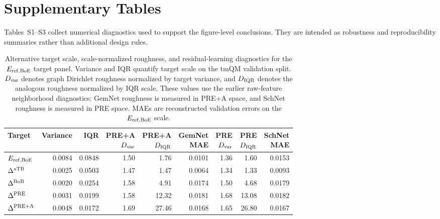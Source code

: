 \documentclass[11pt]{article}
\begin{document}
\clearpage

\section*{Supplementary Tables}

Tables~S1--S3 collect numerical diagnostics used to support the figure-level conclusions. They are intended as robustness and reproducibility summaries rather than additional design rules.

\begin{table}[H]
  \centering
  \scriptsize
  \setlength{\tabcolsep}{3pt}
  \caption{Alternative target scale, scale-normalized roughness, and residual-learning diagnostics for the \(E_{\rm ref,BoE}\) target panel. Variance and IQR quantify target scale on the tmQM validation split. \(D_{\rm var}\) denotes graph Dirichlet roughness normalized by target variance, and \(D_{\rm IQR}\) denotes the analogous roughness normalized by IQR scale. These values use the earlier raw-feature neighborhood diagnostics: GemNet roughness is measured in PRE+A space, and SchNet roughness is measured in PRE space. MAEs are reconstructed validation errors on the \(E_{\rm ref,BoE}\) scale.}
  \label{tab:target-scale-roughness-diagnostics}
  \begin{tabular}{lrrrrrrrr}
    \toprule
    Target &
    Variance &
    IQR &
    \shortstack{PRE+A\\\(D_{\rm var}\)} &
    \shortstack{PRE+A\\\(D_{\rm IQR}\)} &
    \shortstack{GemNet\\MAE} &
    \shortstack{PRE\\\(D_{\rm var}\)} &
    \shortstack{PRE\\\(D_{\rm IQR}\)} &
    \shortstack{SchNet\\MAE} \\
    \midrule
    \(E_{\rm ref,BoE}\) & 0.0084 & 0.0848 & 1.50 & 1.76 & 0.0101 & 1.36 & 1.60 & 0.0153 \\
    \(\Delta^{\rm xTB}\) & 0.0025 & 0.0503 & 1.47 & 1.47 & 0.0064 & 1.34 & 1.33 & 0.0093 \\
    \(\Delta^{\rm BoB}\) & 0.0020 & 0.0254 & 1.58 & 4.91 & 0.0174 & 1.50 & 4.68 & 0.0179 \\
    \(\Delta^{\rm PRE}\) & 0.0031 & 0.0199 & 1.58 & 12.32 & 0.0181 & 1.68 & 13.08 & 0.0182 \\
    \(\Delta^{\rm PRE+A}\) & 0.0048 & 0.0172 & 1.69 & 27.46 & 0.0168 & 1.65 & 26.80 & 0.0167 \\
    \bottomrule
  \end{tabular}
\end{table}
\end{document}
